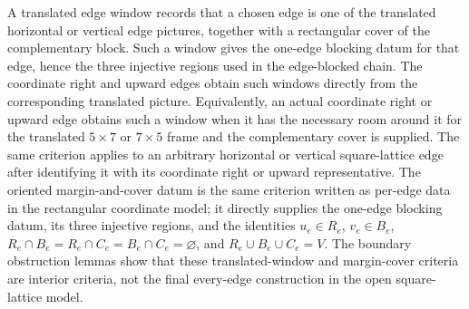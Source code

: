 \begin{definition}
    \leanok
    A translated edge window records that a chosen edge is one of the
    translated horizontal or vertical edge pictures, together with a
    rectangular cover of the complementary block. Such a window gives the
    one-edge blocking datum for that edge, hence the three injective regions
    used in the edge-blocked chain. The coordinate right and upward edges
    obtain such windows directly from the corresponding translated picture.
    Equivalently, an actual coordinate right or upward edge obtains such a
    window when it has the necessary room around it for the translated
    $5\times7$ or $7\times5$ frame and the complementary cover is supplied.
    The same criterion applies to an arbitrary horizontal or vertical
    square-lattice edge after identifying it with its coordinate right or
    upward representative. The oriented margin-and-cover datum is the same
    criterion written as per-edge data in the rectangular coordinate model;
    it directly supplies the one-edge blocking datum, its three injective
    regions, and the identities
    $u_e\in R_e$, $v_e\in B_e$,
    $R_e\cap B_e=R_e\cap C_e=B_e\cap C_e=\varnothing$, and
    $R_e\cup B_e\cup C_e=V$. The boundary obstruction lemmas show that these
    translated-window and margin-cover criteria are interior criteria, not the
    final every-edge construction in the open square-lattice model.
\end{definition}

